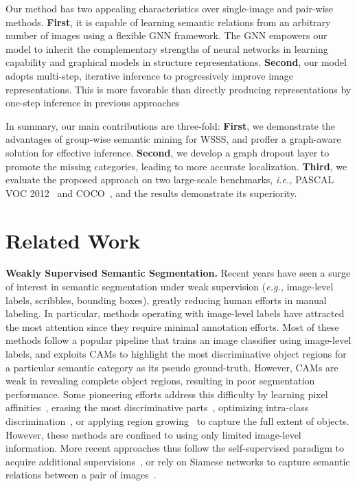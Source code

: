 \documentclass[letterpaper]{article} \usepackage{aaai21}  \usepackage{times}  \usepackage{helvet} \usepackage{courier}  \usepackage[hyphens]{url}  \usepackage{graphicx} \urlstyle{rm} \def\UrlFont{\rm}  \usepackage{graphicx}  \usepackage{natbib}  \usepackage{caption} \frenchspacing  \setlength{\pdfpagewidth}{8.5in}  \setlength{\pdfpageheight}{11in}
\newcommand{\eg}[1]{\textit{e.g.,}}
\newcommand{\ie}[1]{\textit{i.e.,}}
\begin{document}
Our method has two appealing characteristics over single-image and pair-wise methods. \textbf{First}, it is capable of learning semantic relations from an arbitrary number of images using a flexible GNN framework. The GNN empowers our model to inherit the complementary strengths of neural networks in learning capability and graphical models in structure representations. \textbf{Second}, our model adopts multi-step, iterative inference to progressively improve image representations. This is more favorable than directly producing representations by one-step inference in previous approaches

In summary, our main contributions are three-fold: \textbf{First}, we demonstrate the advantages of group-wise semantic mining for WSSS, and proffer a graph-aware solution for effective inference. \textbf{Second}, we develop a graph dropout layer to promote the missing categories, leading to more accurate localization. \textbf{Third}, we evaluate the proposed approach on two large-scale benchmarks, \ie, PASCAL VOC 2012~\cite{everingham2010pascal} and COCO~\cite{lin2014microsoft}, and the results demonstrate its superiority. 




\section{Related Work}

\noindent\textbf{Weakly Supervised Semantic Segmentation.}
Recent years have seen	a surge of interest in semantic segmentation under weak supervision (\eg, image-level labels, scribbles, bounding boxes), greatly reducing human efforts in manual labeling. In particular, methods operating with image-level labels have attracted the most attention since they require minimal annotation efforts. Most of these methods follow a popular pipeline that trains an image classifier using image-level labels, and exploits CAMs to highlight the most discriminative object regions for a particular semantic category as its pseudo ground-truth. However, CAMs are weak in revealing complete object regions, resulting in poor segmentation performance. Some pioneering efforts address this difficulty 
by learning pixel affinities~\cite{ahn2018learning}, erasing the most discriminative parts~\cite{wei2017object,choe2019attention,lee2019ficklenet}, optimizing intra-class discrimination~\cite{fan2020learning}, or applying region growing~\cite{kolesnikov2016seed,wei2018revisiting,huang2018weakly} to capture the full extent of objects. However, these methods are confined to using only limited image-level information. More recent approaches thus follow the self-supervised paradigm to acquire additional supervisions~\cite{shimoda2019self,wang2020self}, or rely on Siamese networks to capture semantic relations between a pair of images~\cite{fan2020cian,sun2020mining}. 
\end{document}
